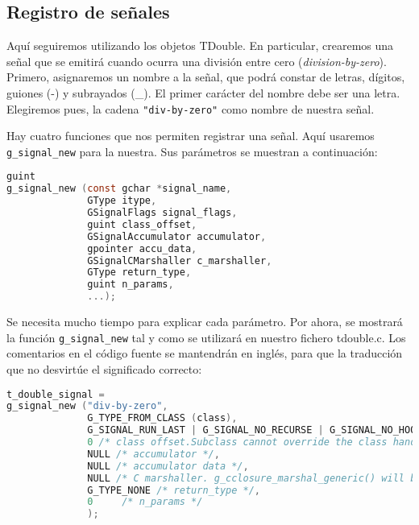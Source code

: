 \subsection{Registro de señales}
Aquí seguiremos utilizando los objetos \textsf{TDouble}. En particular, crearemos una señal que se emitirá
cuando ocurra una división entre cero (\emph{division-by-zero}).
Primero, asignaremos un nombre a la señal, que podrá constar de letras, dígitos, guiones (-) y subrayados (\_).
El primer carácter del nombre debe ser una letra. Elegiremos pues, la cadena \texttt{"div-by-zero"}
como nombre de nuestra señal.

Hay cuatro funciones que nos permiten registrar una señal. Aquí usaremos \texttt{g\_signal\_new} para la
nuestra. Sus parámetros se muestran a continuación:
\begin{lstlisting}[language=C, numbers=none]
guint
g_signal_new (const gchar *signal_name,
              GType itype,
              GSignalFlags signal_flags,
              guint class_offset,
              GSignalAccumulator accumulator,
              gpointer accu_data,
              GSignalCMarshaller c_marshaller,
              GType return_type,
              guint n_params,
              ...);
\end{lstlisting}

Se necesita mucho tiempo para explicar cada parámetro. Por ahora, se mostrará la función
\texttt{g\_signal\_new} tal y como se utilizará en nuestro fichero \textsf{tdouble.c}. Los comentarios
en el código fuente se mantendrán en inglés, para que la traducción que no desvirtúe el
significado correcto:
\begin{lstlisting}[language=C, numbers=none]
t_double_signal =
g_signal_new ("div-by-zero",
              G_TYPE_FROM_CLASS (class),
              G_SIGNAL_RUN_LAST | G_SIGNAL_NO_RECURSE | G_SIGNAL_NO_HOOKS,
              0 /* class offset.Subclass cannot override the class handler (default handler). */,
              NULL /* accumulator */,
              NULL /* accumulator data */,
              NULL /* C marshaller. g_cclosure_marshal_generic() will be used */,
              G_TYPE_NONE /* return_type */,
              0     /* n_params */
              );
\end{lstlisting}

